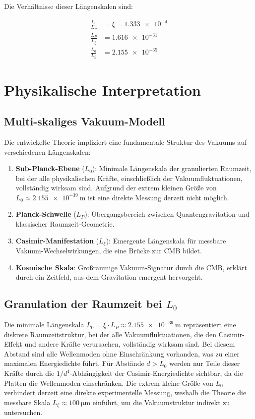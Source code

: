 \documentclass[12pt,a4paper]{article}
\begin{document}
	Die Verhältnisse dieser Längenskalen sind:
	
	\begin{align}
		\frac{L_0}{L_P} &= \xi = \num{1.333e-4} \label{eq:L0_LP_ratio}\\
		\frac{L_P}{L_\xi} &= \num{1.616e-31} \label{eq:LP_Lxi_ratio}\\
		\frac{L_0}{L_\xi} &= \num{2.155e-35} \label{eq:L0_Lxi_ratio}
	\end{align}
	
	\section{Physikalische Interpretation}
	
	\subsection{Multi-skaliges Vakuum-Modell}
	
	Die entwickelte Theorie impliziert eine fundamentale Struktur des Vakuums auf verschiedenen Längenskalen:
	
	\begin{enumerate}
		\item \textbf{Sub-Planck-Ebene} (\( L_0 \)): Minimale Längenskala der granulierten Raumzeit, bei der alle physikalischen Kräfte, einschließlich der Vakuumfluktuationen, vollständig wirksam sind. Aufgrund der extrem kleinen Größe von \( L_0 \approx \SI{2.155e-39}{\meter} \) ist eine direkte Messung derzeit nicht möglich.
		\item \textbf{Planck-Schwelle} (\( L_P \)): Übergangsbereich zwischen Quantengravitation und klassischer Raumzeit-Geometrie.
		\item \textbf{Casimir-Manifestation} (\( L_\xi \)): Emergente Längenskala für messbare Vakuum-Wechselwirkungen, die eine Brücke zur CMB bildet.
		\item \textbf{Kosmische Skala}: Großräumige Vakuum-Signatur durch die CMB, erklärt durch ein Zeitfeld, aus dem Gravitation emergent hervorgeht.
	\end{enumerate}
	
	\subsection{Granulation der Raumzeit bei \( L_0 \)}
	
	Die minimale Längenskala \( L_0 = \xi \cdot L_P \approx \SI{2.155e-39}{\meter} \) repräsentiert eine diskrete Raumzeitstruktur, bei der alle Vakuumfluktuationen, die den Casimir-Effekt und andere Kräfte verursachen, vollständig wirksam sind. Bei diesem Abstand sind alle Wellenmoden ohne Einschränkung vorhanden, was zu einer maximalen Energiedichte führt. Für Abstände \( d > L_0 \) werden nur Teile dieser Kräfte durch die \( 1/d^4 \)-Abhängigkeit der Casimir-Energiedichte sichtbar, da die Platten die Wellenmoden einschränken. Die extrem kleine Größe von \( L_0 \) verhindert derzeit eine direkte experimentelle Messung, weshalb die Theorie die messbare Skala \( L_\xi \approx \SI{100}{\micro\meter} \) einführt, um die Vakuumstruktur indirekt zu untersuchen.
	
\end{document}
